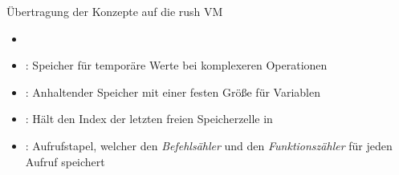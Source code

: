 \begin{frame}{Übertragung der Konzepte auf die rush VM}
	\begin{itemize}
		\item {}
		\item {}: Speicher für temporäre Werte bei komplexeren Operationen
		\item {}: Anhaltender Speicher mit einer festen Größe für Variablen
		\item {}: Hält den Index der letzten freien Speicherzelle in 
		\item {}: Aufrufstapel, welcher den \emph{Befehlsähler} und den \emph{Funktionszähler} für jeden Aufruf speichert
	\end{itemize}
\end{frame}


